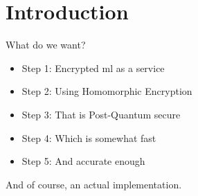 \section{Introduction}
\begin{frame}{What do we want?}
  \begin{itemize}
    \item Step 1: Encrypted \gls{ml} as a service
    \item Step 2: Using Homomorphic Encryption
    \item Step 3: That is Post-Quantum secure
    \item Step 4: Which is somewhat fast
    \item Step 5: And accurate enough
  \end{itemize}

  And of course, an actual implementation.
\end{frame}
